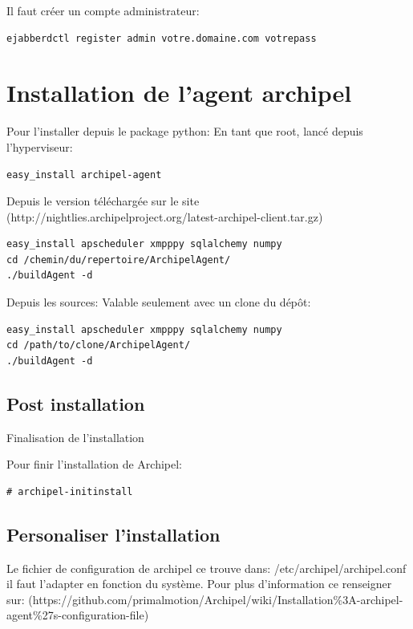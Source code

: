 Il faut créer un compte administrateur:
\begin{lstlisting}
ejabberdctl register admin votre.domaine.com votrepass
\end{lstlisting}

\section{Installation de l'agent archipel}
Pour l'installer depuis le package python:\newline
En tant que root, lancé depuis l'hyperviseur:
\begin{lstlisting}
easy_install archipel-agent
\end{lstlisting}

Depuis le version téléchargée sur le site\newline
 (http://nightlies.archipelproject.org/latest-archipel-client.tar.gz)
\begin{lstlisting}
easy_install apscheduler xmpppy sqlalchemy numpy
cd /chemin/du/repertoire/ArchipelAgent/
./buildAgent -d
\end{lstlisting}

Depuis les sources:\newline
Valable seulement avec un clone du dépôt:
\begin{lstlisting}
easy_install apscheduler xmpppy sqlalchemy numpy
cd /path/to/clone/ArchipelAgent/
./buildAgent -d
\end{lstlisting}

\subsection{Post installation}

Finalisation de  l'installation

Pour finir l'installation de Archipel:
\begin{lstlisting}
# archipel-initinstall
\end{lstlisting}

\subsection{Personaliser l'installation}

Le fichier de configuration de archipel ce trouve dans:\newline
/etc/archipel/archipel.conf il faut l'adapter en fonction du système. 
Pour plus d'information ce renseigner sur:\newline
(https://github.com/primalmotion/Archipel/wiki/Installation\%3A-archipel-agent\%27s-configuration-file)


